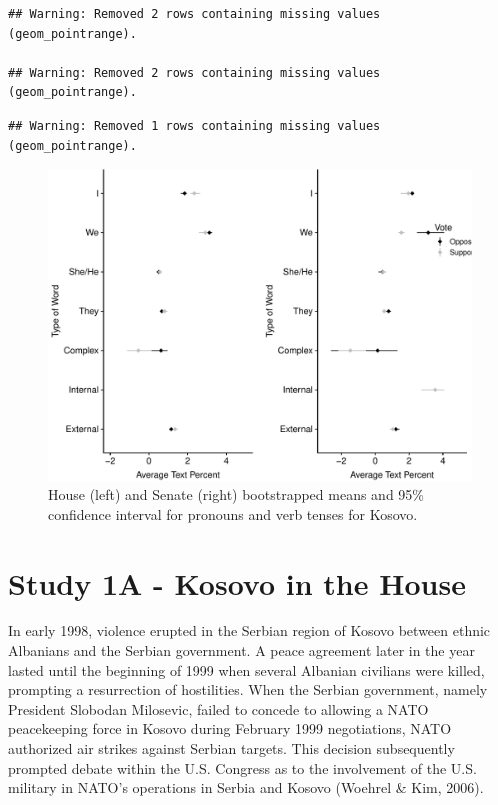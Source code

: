 \documentclass[english,,man]{apa6}
\theoremstyle{definition}
\theoremstyle{definition}
\theoremstyle{definition}
\theoremstyle{remark}
\begin{document}
\begin{verbatim}
## Warning: Removed 2 rows containing missing values (geom_pointrange).

## Warning: Removed 2 rows containing missing values (geom_pointrange).
\end{verbatim}

\begin{verbatim}
## Warning: Removed 1 rows containing missing values (geom_pointrange).
\end{verbatim}

\begin{figure}
\centering
\includegraphics{Language_of_War_Markdown_KJ_files/figure-latex/Kpic-1.pdf}
\caption{\label{fig:Kpic}House (left) and Senate (right) bootstrapped means
and 95\% confidence interval for pronouns and verb tenses for Kosovo.}
\end{figure}

\hypertarget{study-1a---kosovo-in-the-house}{%
\section{Study 1A - Kosovo in the
House}\label{study-1a---kosovo-in-the-house}}

In early 1998, violence erupted in the Serbian region of Kosovo between
ethnic Albanians and the Serbian government. A peace agreement later in
the year lasted until the beginning of 1999 when several Albanian
civilians were killed, prompting a resurrection of hostilities. When the
Serbian government, namely President Slobodan Milosevic, failed to
concede to allowing a NATO peacekeeping force in Kosovo during February
1999 negotiations, NATO authorized air strikes against Serbian targets.
This decision subsequently prompted debate within the U.S. Congress as
to the involvement of the U.S. military in NATO's operations in Serbia
and Kosovo (Woehrel \& Kim, 2006).
\end{document}
